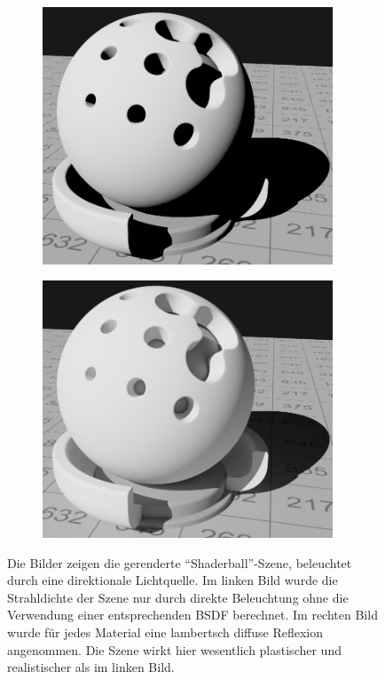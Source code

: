 		\begin{figure}[h]
			\begin{subfigure}[b]{0.5\textwidth}
				\center
				\includegraphics[width=0.95\textwidth]{pic/shaderball-bsdf-0.png}
			\end{subfigure}
			\begin{subfigure}[b]{0.5\textwidth}
				\center
				\includegraphics[width=0.95\textwidth]{pic/shaderball-bsdf-10.png}
			\end{subfigure}
			\caption[Unterschied direkter und indirekter Beleuchtung anhand der \enquote{Shaderball}-Szene]{Die Bilder zeigen die gerenderte \enquote{Shaderball}-Szene, beleuchtet durch eine direktionale Lichtquelle. Im linken Bild wurde die Strahldichte der Szene nur durch direkte Beleuchtung ohne die Verwendung einer entsprechenden BSDF berechnet. Im rechten Bild wurde für jedes Material eine lambertsch diffuse Reflexion angenommen. Die Szene wirkt hier wesentlich plastischer und realistischer als im linken Bild.}
			\label{fig:shaderball-bsdf}
		\end{figure}

